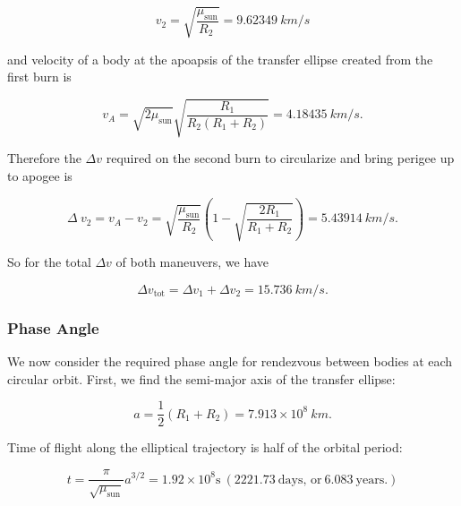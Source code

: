 \documentclass[conf]{new-aiaa}
\begin{document}
\begin{equation}
v_ 2=\sqrt{\frac{ \mu_{\text{sun}} }{ R_ 2\ }} = 9.62349 \ km/s
\end{equation}

and velocity of a body at the apoapsis of the transfer ellipse created from the first burn is

\begin{equation}
v_A = \sqrt{2\mu_{\text{sun}}}\sqrt{\frac{R_ 1}{R_ 2(R_ 1+R_ 2)}} = 4.18435 \ km/s.
\end{equation}

Therefore the $\Delta v$ required on the second burn to circularize and bring perigee up to apogee is

\begin{equation}
\Delta \!\ v_2 = v_A - v_ 2 = \sqrt{\frac{\mu_{\text{sun}}}{R_ 2}}(1 - \sqrt{\frac{2R_ 1}{R_ 1 +R_ 2}}) = 5.43914 \ km/s.
\end{equation}

So for the total $\Delta v$ of both maneuvers, we have

\begin{equation}
\Delta v_{\text{tot}} = \Delta v_1 + \Delta v_2 = 15.736 \ km/s.
\end{equation}

\subsubsection{Phase Angle}

We now consider the required phase angle for rendezvous between bodies at each circular orbit. First, we find the semi-major axis of the transfer ellipse:

\begin{equation}
a = \frac{1}{2}(R_ 1 + R_ 2) = 7.913 \times 10^8 \ km.
\end{equation}

Time of flight along the elliptical trajectory is half of the orbital period:

\begin{equation}
t = \frac{\pi}{\sqrt{\mu_{\text{sun}}}}a^{3/2} = 1.92 \times 10^8 \text{s} \ (2221.73 \ \text{days, or} \ 6.083 \ \text{years.})
\end{equation}
\end{document}

